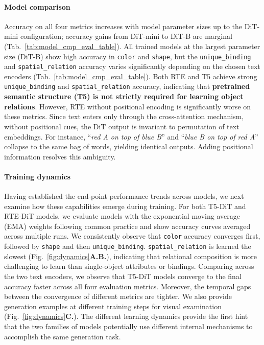 \paragraph{Model comparison}
Accuracy on all four metrics increases with model parameter sizes up to the DiT-mini configuration; accuracy gains from DiT-mini to DiT-B are marginal (Tab.~\ref{tab:model_cmp_eval_table}). All trained models at the largest parameter size (DiT-B) show high accuracy in \texttt{color} and \texttt{shape}, but the \texttt{unique\_binding} and \texttt{spatial\_relation} accuracy varies significantly depending on the chosen text encoders (Tab.~\ref{tab:model_cmp_eval_table}).
Both RTE and T5 achieve strong \texttt{unique\_binding} and \texttt{spatial\_relation} accuracy, indicating that \textbf{pretrained semantic structure (T5) is not strictly required for learning object relations}.
However, RTE without positional encoding is significantly worse on these metrics.
Since text enters only through the cross-attention mechanism, without positional cues, the DiT output is invariant to permutation of text embeddings. For instance, ``\textit{red A on top of blue B}'' and ``\textit{blue B on top of red A}'' collapse to the same bag of words, yielding identical outputs. Adding positional information resolves this ambiguity.

\paragraph{Training dynamics}
Having established the end-point performance trends across models, we next examine how these capabilities emerge during training. For both T5-DiT and RTE-DiT models, we evaluate models with the exponential moving average (EMA) weights \citep{Karras2024EDM2Analyzing} following common practice and show accuracy curves averaged across multiple runs. We consistently observe that \texttt{color} accuracy converges first, followed by \texttt{shape} and then \texttt{unique\_binding}. \texttt{spatial\_relation} is learned the slowest (Fig.~\ref{fig:dynamics}\textbf{A.B.}), indicating that relational composition is more challenging to learn than single-object attributes or bindings. Comparing across the two text encoders, we observe that T5-DiT models converge to the final accuracy faster across all four evaluation metrics. Moreover, the temporal gaps between the convergence of different metrics are tighter. We also provide generation examples at different training steps for visual examination (Fig.~\ref{fig:dynamics}\textbf{C.}). The different learning dynamics provide the first hint that the two families of models potentially use different internal mechanisms to accomplish the same generation task.

